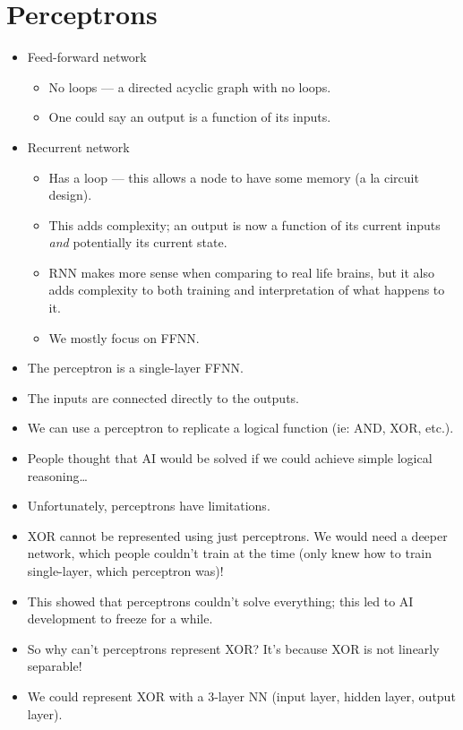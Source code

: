 \documentclass{article}
\begin{document}
\section{Perceptrons}
\begin{itemize}
    \item Feed-forward network
        \begin{itemize}
            \item No loops --- a directed acyclic graph with no loops.
            \item One could say an output is a function of its inputs.
        \end{itemize}
    \item Recurrent network
        \begin{itemize}
            \item Has a loop --- this allows a node to have some memory (a la circuit design).
            \item This adds complexity; an output is now a function of its current inputs \emph{and} potentially its current state.
            \item RNN makes more sense when comparing to real life brains, but it also adds complexity to both training and interpretation of what happens to it.
            \item We mostly focus on FFNN.
        \end{itemize}
    \item The perceptron is a single-layer FFNN.
    \item The inputs are connected directly to the outputs.
    \item We can use a perceptron to replicate a logical function (ie: AND, XOR, etc.).
    \item People thought that AI would be solved if we could achieve simple logical reasoning\dots
    \item Unfortunately, perceptrons have limitations.
    \item XOR cannot be represented using just perceptrons.  We would need a deeper network, which people couldn't train at the time (only knew how to train single-layer, which perceptron was)!
    \item This showed that perceptrons couldn't solve everything; this led to AI development to freeze for a while.
    \item So why can't perceptrons represent XOR?  It's because XOR is not linearly separable!
    \item We could represent XOR with a 3-layer NN (input layer, hidden layer, output layer).
\end{itemize}
\end{document}

